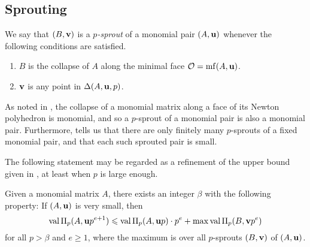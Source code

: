 \documentclass[11pt]{amsart}
\begin{document}




\subsection{Sprouting}

\begin{definition}
\label{p-sprout: D}
We say that $(B, \mathbf{v})$ is a \emph{$p$-sprout} of a monomial pair $(A, \mathbf{u})$ whenever the following conditions are satisfied.
\begin{enumerate}
\item $B$ is the collapse of $A$ along the minimal face $\mathcal{O} = \operatorname{mf}(A, \mathbf{u})$.
\item $\mathbf{v}$ is any point in $\Delta(A, \mathbf{u}, p)$.
\end{enumerate}
\end{definition}



\begin{remark}
\label{p-sprout: R} 
As noted in , the collapse of a monomial matrix along a face of its Newton polyhedron is monomial, and so a $p$-sprout of a monomial pair is also a monomial pair.  Furthermore,    tells us that there are only finitely many $p$-sprouts of a fixed monomial pair, and that each such sprouted pair is small. 
 \end{remark}

The following statement may be regarded as a refinement of the upper bound given in , at least when $p$ is large enough.


\begin{corollary}\label{cor: upper bound for higher mus}
Given a monomial matrix $A$, there exists an integer $\beta$ with the following property\textup:  If $(A, \mathbf{u})$ is very small, then
%
\[ \operatorname{val} \Pi_p(A, \mathbf{u}p^{e+1})  \leqslant  \operatorname{val} \Pi_p(A, \mathbf{u}p) \cdot p^e +  \max \operatorname{val} \Pi_p(B, \mathbf{v}p^e) \] 
%
for all $p > \beta$ and $e \geq 1$, where the maximum is over all $p$-sprouts $(B, \mathbf{v})$ of $(A, \mathbf{u})$.  
\end{corollary}
\end{document}
